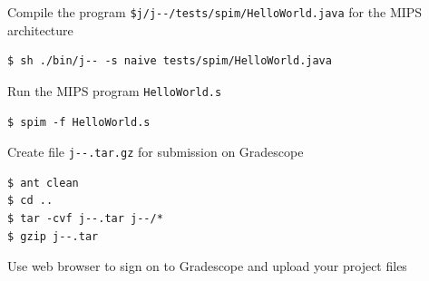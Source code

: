 \documentclass[8pt,a4paper,compress]{beamer}
\newlength{\myMheight}
\begin{document}
\begin{frame}[fragile]
\pause\transdissolve

Compile the \jmm program \lstinline{$j/j--/tests/spim/HelloWorld.java} for the MIPS architecture

\begin{tcolorbox}[enhanced,drop shadow southwest,sharp corners,size=fbox,colback=black]
\begin{lstlisting}[style=terminal]
$ sh ./bin/j-- -s naive tests/spim/HelloWorld.java
\end{lstlisting}
\end{tcolorbox}

\pause\transdissolve\bigskip

Run the MIPS program \lstinline{HelloWorld.s}

\begin{tcolorbox}[enhanced,drop shadow southwest,sharp corners,size=fbox,colback=black]
\begin{lstlisting}[style=terminal]
$ spim -f HelloWorld.s
\end{lstlisting}
\end{tcolorbox}

\pause\transdissolve\bigskip

Create file \lstinline{j--.tar.gz} for submission on Gradescope

\begin{tcolorbox}[enhanced,drop shadow southwest,sharp corners,size=fbox,colback=black]
\begin{lstlisting}[style=terminal]
$ ant clean
$ cd ..
$ tar -cvf j--.tar j--/*
$ gzip j--.tar
\end{lstlisting}
\end{tcolorbox}

\pause\transdissolve\bigskip

Use web browser  to sign on to Gradescope and upload your project files
\end{frame}
\end{document}
